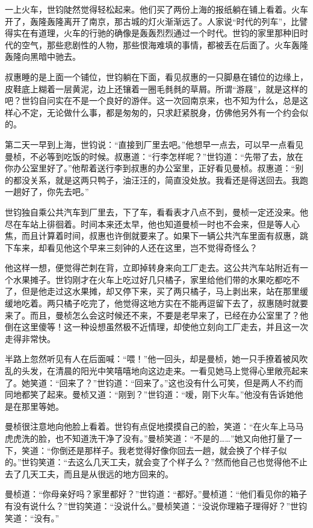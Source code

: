\par 一上火车，世钧陡然觉得轻松起来。他们买了两份上海的报纸躺在铺上看着。火车开了，轰隆轰隆离开了南京，那古城的灯火渐渐远了。人家说“时代的列车”，比譬得实在有道理，火车的行驰的确像是轰轰烈烈通过一个时代。世钧的家里那种旧时代的空气，那些悲剧性的人物，那些恨海难填的事情，都被丢在后面了。火车轰隆轰隆向黑暗中驰去。
\par 叔惠睡的是上面一个铺位，世钧躺在下面，看见叔惠的一只脚悬在铺位的边缘上，皮鞋底上糊着一层黄泥，边上还镶着一圈毛毵毵的草屑。所谓“游屐”，就是这样的吧？世钧自问实在不是一个良好的游伴。这一次回南京来，也不知为什么，总是这样心不定，无论做什么事，都是匆匆的，只求赶紧脱身，仿佛他另外有一个约会似的。
\par 第二天一早到上海，世钧说：“直接到厂里去吧。”他想早一点去，可以早一点看见曼桢，不必等到吃饭的时候。叔惠道：“行李怎样呢？”世钧道：“先带了去，放在你办公室里好了。”他帮着送行李到叔惠的办公室里，正好看见曼桢。叔惠道：“别的都没关系，就是这两只鸭子，油汪汪的，简直没处放。我看还是得送回去。我跑一趟好了，你先去吧。”
\par 世钧独自乘公共汽车到厂里去，下了车，看看表才八点不到，曼桢一定还没来。他尽在车站上徘徊着。时间本来还太早，他也知道曼桢一时也不会来，但是等人心焦，而且计算着时间，叔惠也许倒就要来了。如果下一辆公共汽车里面有叔惠，跳下车来，却看见他这个早来三刻钟的人还在这里，岂不觉得奇怪么？
\par 他这样一想，便觉得芒刺在背，立即掉转身来向工厂走去。这公共汽车站附近有一个水果摊子。世钧刚才在火车上吃过好几只橘子，家里给他们带的水果吃都吃不了，但是他走过这水果摊，却又停下来，买了两只橘子，马上剥出来，站在那里缓缓地吃着。两只橘子吃完了，他觉得这地方实在不能再逗留下去了，叔惠随时就要来了。而且，曼桢怎么会这时候还不来，不要是老早来了，已经在办公室里了？他倒在这里傻等！这一种设想虽然极不近情理，却使他立刻向工厂走去，并且这一次走得非常快。
\par 半路上忽然听见有人在后面喊：“喂！”他一回头，却是曼桢，她一只手撩着被风吹乱的头发，在清晨的阳光中笑嘻嘻地向这边走来。一看见她马上觉得心里敞亮起来了。她笑道：“回来了？”世钧道：“回来了。”这也没有什么可笑，但是两人不约而同地都笑了起来。曼桢又道：“刚到？”世钧道：“嗳，刚下火车。”他没有告诉她他是在那里等她。
\par 曼桢很注意地向他脸上看着。世钧有点促地摸摸自己的脸，笑道：“在火车上马马虎虎洗的脸，也不知道洗干净了没有。”曼桢笑道：“不是的……”她又向他打量了一下，笑道：“你倒还是那样子。我老觉得好像你回去一趟，就会换了个样子似的。”世钧笑道：“去这么几天工夫，就会变了个样子么？”然而他自己也觉得他不止去了几天工夫，而且是从很远的地方回来的。
\par 曼桢道：“你母亲好吗？家里都好？”世钧道：“都好。”曼桢道：“他们看见你的箱子有没有说什么？”世钧笑道：“没说什么。”曼桢笑道：“没说你理箱子理得好？”世钧笑道：“没有。”
